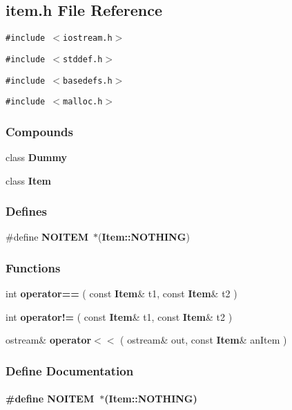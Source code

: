 \subsection{item.h File Reference}
\label{item.h}
{\tt \#include $<$iostream.h$>$}\par
{\tt \#include $<$stddef.h$>$}\par
{\tt \#include $<$basedefs.h$>$}\par
{\tt \#include $<$malloc.h$>$}\par
\subsubsection*{Compounds}
\begin{CompactItemize}
\item 
class {\bf Dummy}
\item 
class {\bf Item}
\end{CompactItemize}
\subsubsection*{Defines}
\begin{CompactItemize}
\item 
\#define {\bf NOITEM}\ $\ast$({\bf Item::NOTHING})
\end{CompactItemize}
\subsubsection*{Functions}
\begin{CompactItemize}
\item 
int {\bf operator==} ( const {\bf Item}\& t1, const {\bf Item}\& t2 )
\item 
int {\bf operator!=} ( const {\bf Item}\& t1, const {\bf Item}\& t2 )
\item 
ostream\& {\bf operator$<$$<$} ( ostream\& out, const {\bf Item}\& an\-Item )
\end{CompactItemize}


\subsubsection{Define Documentation}
\label{item.h_a0}
\paragraph{\setlength{\rightskip}{0pt plus 5cm}\#define NOITEM\ $\ast$({\bf Item::NOTHING})}\hfill



